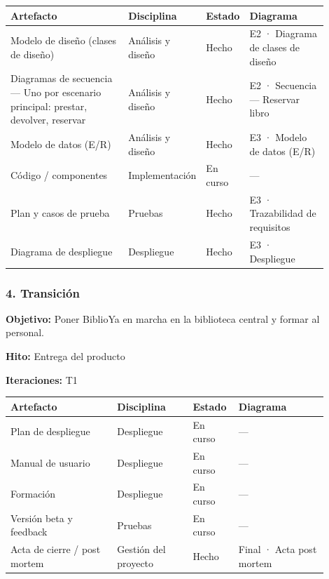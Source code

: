 {\small
\begin{longtable}{@{}>{\raggedright\arraybackslash}p{0.380\linewidth}>{\raggedright\arraybackslash}p{0.172\linewidth}>{\raggedright\arraybackslash}p{0.091\linewidth}>{\raggedright\arraybackslash}p{0.254\linewidth}@{}}
\toprule
\textbf{Artefacto} & \textbf{Disciplina} & \textbf{Estado} & \textbf{Diagrama} \\
\midrule
\endhead
Modelo de diseño (clases de diseño) & Análisis y diseño & Hecho & E2 · Diagrama de clases de diseño \\
Diagramas de secuencia — Uno por escenario principal: prestar, devolver, reservar & Análisis y diseño & Hecho & E2 · Secuencia — Reservar libro \\
Modelo de datos (E/R) & Análisis y diseño & Hecho & E3 · Modelo de datos (E/R) \\
Código / componentes & Implementación & En curso & — \\
Plan y casos de prueba & Pruebas & Hecho & E3 · Trazabilidad de requisitos \\
Diagrama de despliegue & Despliegue & Hecho & E3 · Despliegue \\
\bottomrule
\end{longtable}}

\subsubsection*{4. Transición}

\textbf{Objetivo:} Poner BiblioYa en marcha en la biblioteca central y formar al personal.

\textbf{Hito:} Entrega del producto

\textbf{Iteraciones:} T1

{\small
\begin{longtable}{@{}>{\raggedright\arraybackslash}p{0.311\linewidth}>{\raggedright\arraybackslash}p{0.224\linewidth}>{\raggedright\arraybackslash}p{0.096\linewidth}>{\raggedright\arraybackslash}p{0.267\linewidth}@{}}
\toprule
\textbf{Artefacto} & \textbf{Disciplina} & \textbf{Estado} & \textbf{Diagrama} \\
\midrule
\endhead
Plan de despliegue & Despliegue & En curso & — \\
Manual de usuario & Despliegue & En curso & — \\
Formación & Despliegue & En curso & — \\
Versión beta y feedback & Pruebas & En curso & — \\
Acta de cierre / post mortem & Gestión del proyecto & Hecho & Final · Acta post mortem \\
\bottomrule
\end{longtable}}

